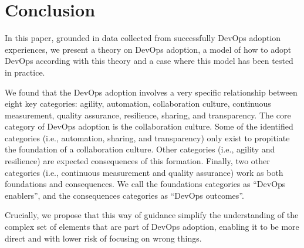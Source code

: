 \section{Conclusion} \label{sec:conclusion}
In this paper, grounded in data collected from successfully DevOps adoption
experiences, we present a theory on DevOps adoption, a model of how to adopt
DevOps according with this theory and a case where this model has been tested
in practice.

We found that the DevOps adoption involves a very specific relationship between
eight key categories: agility, automation, collaboration culture, continuous
measurement, quality assurance, resilience, sharing, and transparency. The core
category of DevOps adoption is the collaboration culture. Some of the
identified categories (i.e., automation, sharing, and transparency) only exist
to propitiate the foundation of a collaboration culture. Other categories
(i.e., agility and resilience) are expected consequences of this formation.
Finally, two other categories (i.e., continuous measurement and quality
assurance) work as both foundations and consequences. We call the foundations
categories as ``DevOps enablers'', and the consequences categories as ``DevOps outcomes''.

Crucially, we propose that this way of guidance simplify the understanding of the
complex set of elements that are part of DevOps adoption, enabling it to be
more direct and with lower risk of focusing on wrong things.
